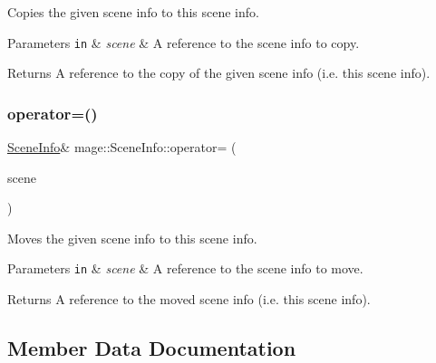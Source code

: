 Copies the given scene info to this scene info.


\begin{DoxyParams}[1]{Parameters}
\mbox{\tt in}  & {\em scene} & A reference to the scene info to copy. \\
\hline
\end{DoxyParams}
\begin{DoxyReturn}{Returns}
A reference to the copy of the given scene info (i.\+e. this scene info). 
\end{DoxyReturn}
\hypertarget{structmage_1_1_scene_info_a61dea73dc9c2f3ca7fdfe70f9bee33ac}{}\label{structmage_1_1_scene_info_a61dea73dc9c2f3ca7fdfe70f9bee33ac} 
\subsubsection{\texorpdfstring{operator=()}{operator=()}\hspace{0.1cm}{\footnotesize\ttfamily [2/2]}}
{\footnotesize\ttfamily \hyperlink{structmage_1_1_scene_info}{Scene\+Info}\& mage\+::\+Scene\+Info\+::operator= (\begin{DoxyParamCaption}\item[{\hyperlink{structmage_1_1_scene_info}{Scene\+Info} \&\&}]{scene }\end{DoxyParamCaption})\hspace{0.3cm}{\ttfamily [default]}}

Moves the given scene info to this scene info.


\begin{DoxyParams}[1]{Parameters}
\mbox{\tt in}  & {\em scene} & A reference to the scene info to move. \\
\hline
\end{DoxyParams}
\begin{DoxyReturn}{Returns}
A reference to the moved scene info (i.\+e. this scene info). 
\end{DoxyReturn}


\subsection{Member Data Documentation}
\hypertarget{structmage_1_1_scene_info_ac939ab198820a49cbbb16f661b07bee7}{}\label{structmage_1_1_scene_info_ac939ab198820a49cbbb16f661b07bee7} 
